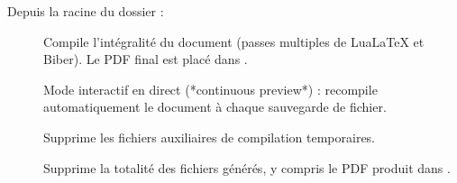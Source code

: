 Depuis la racine du dossier  :
\begin{description}
  \item[] Compile l'intégralité du document (passes multiples de Lua\LaTeX{} et Biber).
  Le PDF final est placé dans .
  \item[] Mode interactif en direct (*continuous preview*) :
  recompile automatiquement le document à chaque sauvegarde de fichier.
  \item[] Supprime les fichiers auxiliaires de compilation temporaires.
  \item[] Supprime la totalité des fichiers générés, y compris le PDF produit dans .
\end{description}
